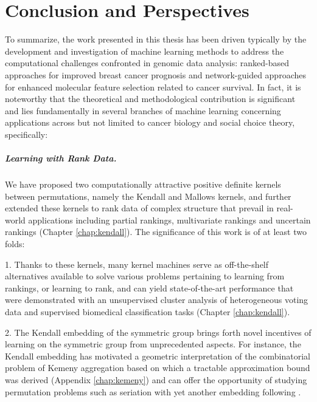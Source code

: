 \chapter{Conclusion and Perspectives}
\label{chap:conclusion}

To summarize, the work presented in this thesis has been driven typically by the development and investigation of machine learning methods to address the computational challenges confronted in genomic data analysis: ranked-based approaches for improved breast cancer prognosis and network-guided approaches for enhanced molecular feature selection related to cancer survival. In fact, it is noteworthy that the theoretical and methodological contribution is significant and lies fundamentally in several branches of machine learning concerning applications across but not limited to cancer biology and social choice theory, specifically:


\paragraph{Learning with Rank Data.}

We have proposed two computationally attractive positive definite kernels between permutations, namely the Kendall and Mallows kernels, and further extended these kernels to rank data of complex structure that prevail in real-world applications including partial rankings, multivariate rankings and uncertain rankings (Chapter \ref{chap:kendall}). The significance of this work is of at least two folds: 
\begin{bulletList}
\item[1.] Thanks to these kernels, many kernel machines serve as off-the-shelf alternatives available to solve various problems pertaining to learning from rankings, or learning to rank, and can yield state-of-the-art performance that were demonstrated with an unsupervised cluster analysis of heterogeneous voting data and supervised biomedical classification tasks (Chapter \ref{chap:kendall}).
\item[2.] The Kendall embedding of the symmetric group brings forth novel incentives of learning on the symmetric group from unprecedented aspects. For instance, the Kendall embedding has motivated a geometric interpretation of the combinatorial problem of Kemeny aggregation based on which a tractable approximation bound was derived (Appendix \ref{chap:kemeny}) and can offer the opportunity of studying permutation problems such as seriation with yet another embedding following \cite{Fogel2013Convex, Lim2014Beyond}.
\end{bulletList}


